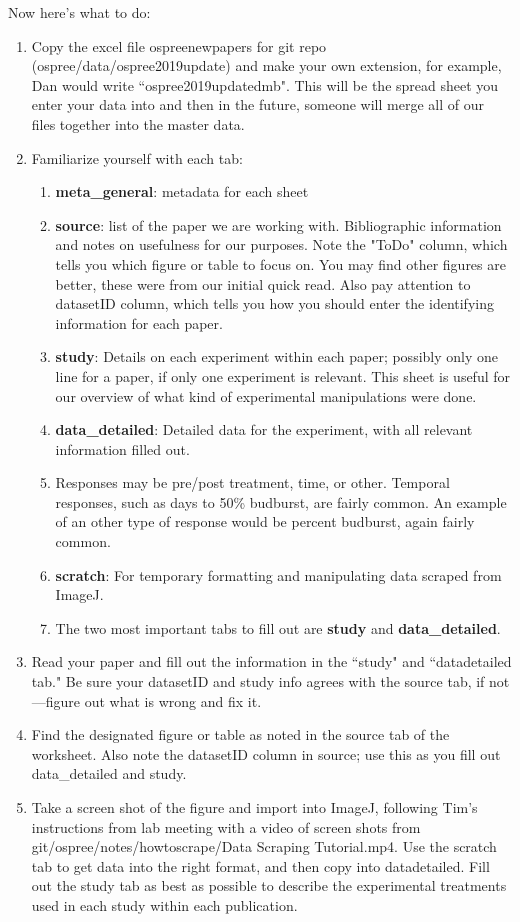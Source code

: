 \documentclass{article}\usepackage[]{graphicx}\usepackage[]{color}
\begin{document}
Now here's what to do:
\begin{enumerate}
\item Copy the excel file ospree\textunderscore newpapers for git repo (ospree/data/ospree\textunderscore 2019update) and make your own extension, for example, Dan would write ``ospree\textunderscore 2019update\textunderscore dmb". This will be the spread sheet you enter your data into and then in the future, someone will merge all of our files together into the master data.
\item Familiarize yourself with each tab:
  \begin{enumerate}
  \item \textbf{meta\_general}: metadata for each sheet
  \item \textbf{source}: list of the paper we are working with. Bibliographic information and notes on usefulness for our purposes. Note the "ToDo" column, which tells you which figure or table to focus on. You may find other figures are better, these were from our initial quick read. Also pay attention to datasetID column, which tells you how you should enter the identifying information for each paper.
  \item \textbf{study}: Details on each experiment within each paper; possibly only one line for a paper, if only one experiment is relevant. This sheet is useful for our overview of what kind of experimental manipulations were done.
  \item \textbf{data\_detailed}: Detailed data for the experiment, with all relevant information filled out.
  \item Responses may be pre/post treatment, time, or other. Temporal responses, such as days to 50\% budburst, are fairly common. An example of an other type of response would be percent budburst, again fairly common.
  \item \textbf{scratch}: For temporary formatting and manipulating data scraped from ImageJ.
  \item The two most important tabs to fill out are \textbf{study} and \textbf{data\_detailed}. 
  \end{enumerate}
\item Read your paper and fill out the information in the ``study" and ``data\textunderscore detailed tab." Be sure your datasetID and study info agrees with the source tab, if not---figure out what is wrong and fix it.
\item Find the designated figure or table as noted in the source tab of the worksheet. Also note the datasetID column in source; use this as you fill out data\_detailed and study.
\item Take a screen shot of the figure and import into ImageJ, following Tim's instructions from lab meeting with a video of screen shots from git/ospree/notes/howtoscrape/Data Scraping Tutorial.mp4. Use the scratch tab to get data into the right format, and then copy into data\textunderscore detailed. Fill out the study tab as best as possible to describe the experimental treatments used in each study within each publication.
\end{enumerate}
\end{document}
